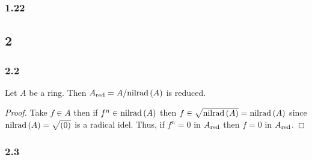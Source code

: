 \documentclass[12pt]{article}
\begin{document}
\subsubsection{1.22}

\subsection{2}

\subsubsection{2.2}

\begin{proposition}
Let $A$ be a ring. Then $A_{\mathrm{red}} = A / \mathrm{nilrad}\left( A \right)$ is reduced.
\end{proposition}

\begin{proof}
Take $f \in A$ then if $f^n \in \mathrm{nilrad}\left( A \right)$ then $f \in \sqrt{\mathrm{nilrad}\left( A \right)} = \mathrm{nilrad}\left( A \right)$ since $\mathrm{nilrad}\left( A \right) = \sqrt{(0)}$ is a radical idel. Thus, if $f^n = 0$ in $A_{\mathrm{red}}$ then $f = 0$ in $A_{\mathrm{red}}$. 
\end{proof}

\subsubsection{2.3}
\end{document}
